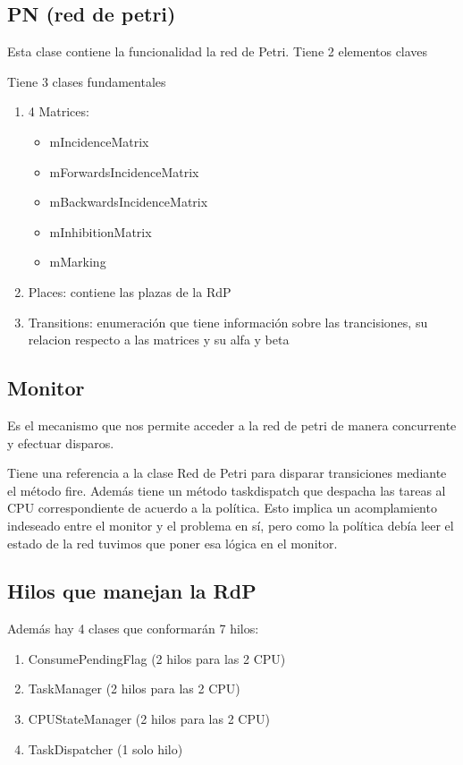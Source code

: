 \documentclass[a4paper,11pt]{article}
\begin{document}
    \subsection{PN (red de petri)}
    Esta clase contiene la funcionalidad la red de Petri.
    Tiene 2 elementos claves
    
    Tiene 3 clases fundamentales
    \begin{enumerate}
        \item 4 Matrices:
        \begin{itemize}
            \item mIncidenceMatrix
            \item mForwardsIncidenceMatrix
            \item mBackwardsIncidenceMatrix
            \item mInhibitionMatrix
            \item mMarking
        \end{itemize}
        \item Places: contiene las plazas de la RdP
        \item Transitions: enumeración que tiene información sobre las trancisiones, su relacion respecto a las matrices y su alfa y beta
    \end{enumerate}
    
    \subsection{Monitor}
    Es el mecanismo que nos permite acceder a la red de petri 
    de manera concurrente y efectuar disparos.
    
    Tiene una referencia a la clase Red de Petri para disparar transiciones mediante el método fire.
    Además tiene un método taskdispatch que despacha las tareas al CPU correspondiente
    de acuerdo a la política. Esto implica un acomplamiento indeseado entre el monitor y el
    problema en sí, pero como la política debía leer el estado de la red tuvimos que poner esa lógica
    en el monitor.
    
    \subsection{Hilos que manejan la RdP}
    Además hay 4 clases que conformarán 7 hilos:
    \begin{enumerate}
        \item ConsumePendingFlag (2 hilos para las 2 CPU)
        \item TaskManager (2 hilos para las 2 CPU)
        \item CPUStateManager (2 hilos para las 2 CPU)
        \item TaskDispatcher (1 solo hilo)
    \end{enumerate}
\end{document}
